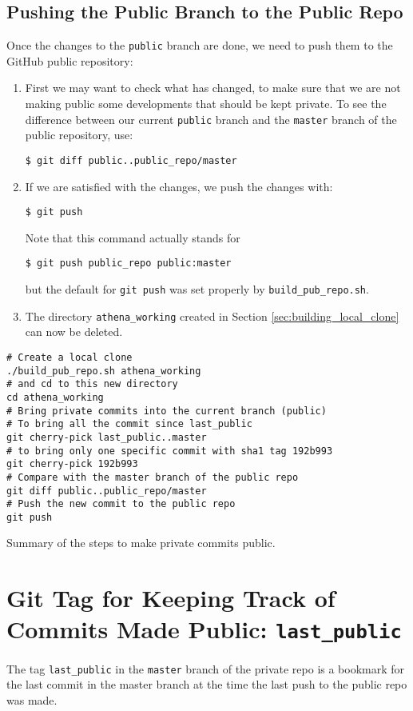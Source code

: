 \documentclass[11pt]{article}
\begin{document}
\subsection{Pushing the Public Branch to the Public Repo}
\label{sec:push_the_public_branch_to_the_public_repo}
Once the changes to the \texttt{public} branch are done, we need to
push them to the GitHub public repository:
\begin{enumerate}
\item First we may want to check what has changed, to make sure that
we are not making public some developments that should be kept
private. To see the difference between our current \texttt{public}
branch and the \texttt{master} branch of the public repository, use:
\begin{verbatim}
$ git diff public..public_repo/master
\end{verbatim}
\item If we are satisfied with the changes, we push the changes with:
\begin{verbatim}
$ git push
\end{verbatim}
Note that this command actually stands for
\begin{verbatim}
$ git push public_repo public:master
\end{verbatim}
but the default for \texttt{git push} was set properly by
\texttt{build\_pub\_repo.sh}.
\item The directory \texttt{athena\_working} created in Section
\ref{sec:building_local_clone} can now be deleted.
\end{enumerate}

\begin{mybox}
\begin{verbatim}
# Create a local clone
./build_pub_repo.sh athena_working
# and cd to this new directory
cd athena_working
# Bring private commits into the current branch (public)
# To bring all the commit since last_public
git cherry-pick last_public..master
# to bring only one specific commit with sha1 tag 192b993
git cherry-pick 192b993
# Compare with the master branch of the public repo
git diff public..public_repo/master
# Push the new commit to the public repo
git push
\end{verbatim}
  \caption{Summary of the steps to make private commits public.
    \label{box:summary}}
\end{mybox}

\section{Git Tag for Keeping Track of Commits Made Public: \texttt{last\_public}}
\label{sec:last_pub_tag}
The tag \texttt{last\_public} in the \texttt{master} branch of the
private repo is a bookmark for the last commit in the master branch at
the time the last push to the public repo was made.
\end{document}

